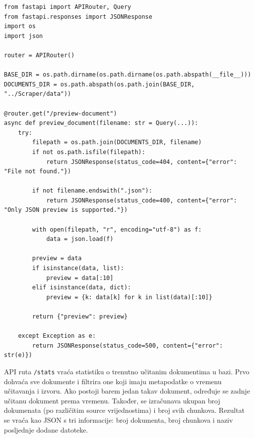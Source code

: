 \documentclass[]{foi}
\begin{document}
\begin{longlisting}
\begin{verbatim}
from fastapi import APIRouter, Query
from fastapi.responses import JSONResponse
import os
import json

router = APIRouter()

BASE_DIR = os.path.dirname(os.path.dirname(os.path.abspath(__file__)))
DOCUMENTS_DIR = os.path.abspath(os.path.join(BASE_DIR, "../Scraper/data"))

@router.get("/preview-document")
async def preview_document(filename: str = Query(...)):
    try:
        filepath = os.path.join(DOCUMENTS_DIR, filename)
        if not os.path.isfile(filepath):
            return JSONResponse(status_code=404, content={"error": "File not found."})

        if not filename.endswith(".json"):
            return JSONResponse(status_code=400, content={"error": "Only JSON preview is supported."})

        with open(filepath, "r", encoding="utf-8") as f:
            data = json.load(f)

        preview = data
        if isinstance(data, list):
            preview = data[:10]
        elif isinstance(data, dict):
            preview = {k: data[k] for k in list(data)[:10]}

        return {"preview": preview}

    except Exception as e:
        return JSONResponse(status_code=500, content={"error": str(e)})
\end{verbatim}
\caption{Preview.py}
\label{lst:preview}
\end{longlisting}

API ruta \verb|/stats| vraća statistiku o trenutno učitanim dokumentima u bazi. Prvo dohvaća sve dokumente i filtrira one koji imaju metapodatke o vremenu
učitavanja i izvoru. Ako postoji barem jedan takav dokument, određuje se zadnje učitanu dokument prema vremenu. Također, se izračunava ukupan
broj dokumenata (po različitim source vrijednostima) i broj svih chunkova. Rezultat se vraća kao JSON s tri informacije: broj dokumenta, broj chunkova i naziv posljednje dodane datoteke.
\end{document}
